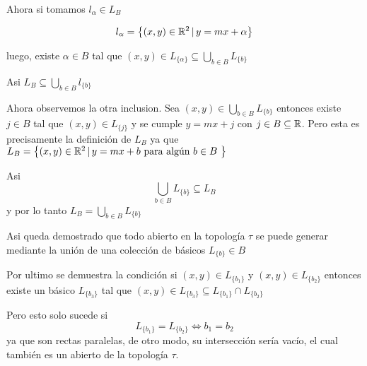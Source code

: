 \documentclass{amsart}
\begin{document}
{    Ahora si tomamos $ l_\alpha \in L_{B} $

    $$ l_{\alpha} = \left\{ (x,y) \in \mathbb{R}^2 \, | \, y = mx + \alpha \right\} $$

    luego, existe $ \alpha \in B $ tal que $(x,y) \in L_{\{\alpha\}} \subseteq \bigcup\limits_{b \in B} L_{\{b\}} $

    Asi $ L_{B} \subseteq \bigcup\limits_{b\in B} l_{\{b\}} $

    Ahora observemos la otra inclusion. Sea $ (x,y) \in \bigcup\limits_{b\in B} L_{ \{b\} } $ entonces existe $ j \in B $ tal que $ (x,y) \in L_{\{j\}} $ y se cumple $ y = mx + j $ con $j \in B \subseteq \mathbb{R} $. Pero esta es precisamente la definición de $ L_{B} $ ya que $ L_{B} = \left\{ (x,y) \in \mathbb{R}^2 \, | \, y = mx + b \mbox{ para algún $ b \in B $ } \right\} $

    Asi
    $$ \bigcup_{ b \in B} L_{\{b\}} \subseteq L_{B} $$
    y por lo tanto $ L_{B} = \bigcup\limits_{b \in B} L_{\{b\}} $

    Asi queda demostrado que todo abierto en la topología $ \tau $ se puede generar mediante la unión de una colección de básicos $ L_{\{b\}} \in B $ 

    Por ultimo se demuestra la condición si $ (x,y) \in L_{\{b_{1}\}} $ y $ (x,y) \in L_{\{b_{2}\}} $ entonces existe un básico $ L_{\{b_{3}\}} $ tal que $ (x,y) \in L_{\{b_{3}\}} \subseteq L_{\{b_{1}\}} \cap L_{\{b_{2}\}} $

    Pero esto solo sucede si
    $$  L_{\{b_1\}} = L_{\{b_2\}} \Longleftrightarrow b_1 = b_2$$
    ya que son rectas paralelas, de otro modo, su intersección sería vacío, el cual también es un abierto de la topología $ \tau $.
}
\end{document}
